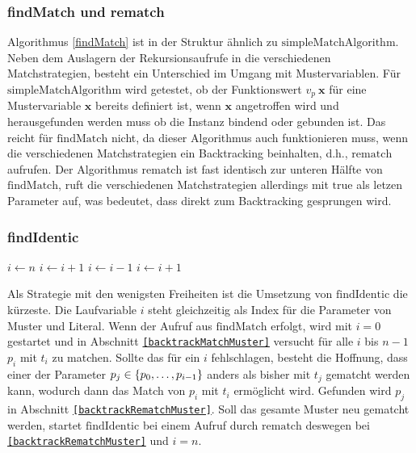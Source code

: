 \subsubsection{findMatch und rematch}
Algorithmus \ref{findMatch} ist in der Struktur ähnlich zu $\mathrm{simpleMatchAlgorithm}$. Neben dem Auslagern der Rekursionsaufrufe in die verschiedenen Matchstrategien, besteht ein Unterschied im Umgang mit Mustervariablen. Für $\mathrm{simpleMatchAlgorithm}$ wird getestet, ob der Funktionswert $v_p~\mathbf x$ für eine Mustervariable $\mathbf x$ bereits definiert ist, wenn $\mathbf x$ angetroffen wird und herausgefunden werden muss ob die Instanz bindend oder gebunden ist. Das reicht für $\mathrm{findMatch}$ nicht, da dieser Algorithmus auch funktionieren muss, wenn die verschiedenen Matchstrategien ein Backtracking beinhalten, d.h., $\mathrm{rematch}$ aufrufen.
Der Algorithmus $\mathrm{rematch}$ ist fast identisch zur unteren Hälfte von $\mathrm{findMatch}$, ruft die verschiedenen Matchstrategien allerdings mit $\mathrm{true}$ als letzen Parameter auf, was bedeutet, dass direkt zum Backtracking gesprungen wird.



\subsubsection {findIdentic}
\begin{algorithm}
\DontPrintSemicolon
\caption{$\mathrm{findIdentic} \colon M \times T \times \mathit{Bool} \rightarrow \mathit{Bool}$}\label{findIdentic}
\;
 {
	$i \leftarrow n$\;
	\Goto {\ref{backtrackRematchMuster}}\;
}
\Loop {} {
	 \label{backtrackMatchMuster}
	 {
		$i \leftarrow i + 1$\;
		 {}    
	}
	 \label{backtrackRematchMuster}
	 { 
		 {}
		$i \leftarrow i - 1$\;
	}    
	$i \leftarrow i + 1$\;
}
\end{algorithm}


Als Strategie mit den wenigsten Freiheiten ist die Umsetzung von $\mathrm{findIdentic}$ die kürzeste. Die Laufvariable $i$ steht gleichzeitig als Index für die Parameter von Muster und Literal. Wenn der Aufruf aus $\mathrm{findMatch}$ erfolgt, wird mit $i = 0$ gestartet und in Abschnitt \texttt{\ref{backtrackMatchMuster}} versucht für alle $i$ bis $n-1$ $p_i$ mit $t_i$ zu matchen. Sollte das  für ein $i$ fehlschlagen, besteht die Hoffnung, dass einer der Parameter $p_j \in \{{p}_{0}, \dots, {p}_{i-1}\}$ anders als bisher mit $t_j$ gematcht werden kann, wodurch dann das Match von $p_i$ mit $t_i$ ermöglicht wird. Gefunden wird $p_j$ in Abschnitt \texttt{\ref{backtrackRematchMuster}}. 
Soll das gesamte Muster neu gematcht werden, startet $\mathrm{findIdentic}$ bei einem Aufruf durch $\mathrm{rematch}$ deswegen bei \texttt{\ref{backtrackRematchMuster}} und $i = n$.




